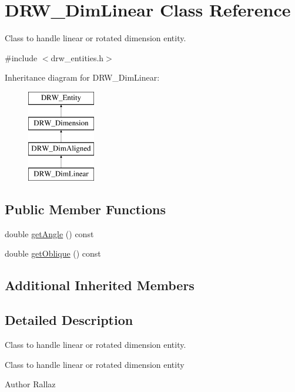 \hypertarget{class_d_r_w___dim_linear}{}\section{D\+R\+W\+\_\+\+Dim\+Linear Class Reference}
\label{class_d_r_w___dim_linear}


Class to handle linear or rotated dimension entity.  




{\ttfamily \#include $<$drw\+\_\+entities.\+h$>$}

Inheritance diagram for D\+R\+W\+\_\+\+Dim\+Linear\+:\begin{figure}[H]
\begin{center}
\leavevmode
\includegraphics[height=4.000000cm]{db/df3/class_d_r_w___dim_linear}
\end{center}
\end{figure}
\subsection*{Public Member Functions}
\begin{DoxyCompactItemize}
\item 
double \hyperlink{class_d_r_w___dim_linear_ab383c82c37c4a4db5b91c2d56676cf89}{get\+Angle} () const 
\item 
double \hyperlink{class_d_r_w___dim_linear_a0ca1a1e9273e6ed0ac400a9352d6fb93}{get\+Oblique} () const 
\end{DoxyCompactItemize}
\subsection*{Additional Inherited Members}


\subsection{Detailed Description}
Class to handle linear or rotated dimension entity. 

Class to handle linear or rotated dimension entity \begin{DoxyAuthor}{Author}
Rallaz 
\end{DoxyAuthor}


